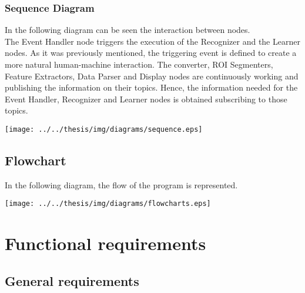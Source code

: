 \documentclass{article}
\begin{document}
\subsubsection{Sequence Diagram}
In the following diagram can be seen the interaction between nodes. \\
The Event Handler node triggers the execution of the Recognizer and the Learner nodes. As it was previously mentioned, the triggering event is defined to create a more natural human-machine interaction.
The converter, ROI Segmenters, Feature Extractors, Data Parser and Display nodes are continuously working and publishing the information on their topics. 
Hence, the information needed for the Event Handler, Recognizer and Learner nodes is obtained subscribing to those topics. 
\begin{center}
\texttt{[image: ../../thesis/img/diagrams/sequence.eps]}
\end{center}

\subsection{Flowchart}
In the following diagram, the flow of the program is represented. 
\begin{center}
\texttt{[image: ../../thesis/img/diagrams/flowcharts.eps]}
\end{center}





\section{Functional requirements}

\subsection{General requirements}
\end{document}
